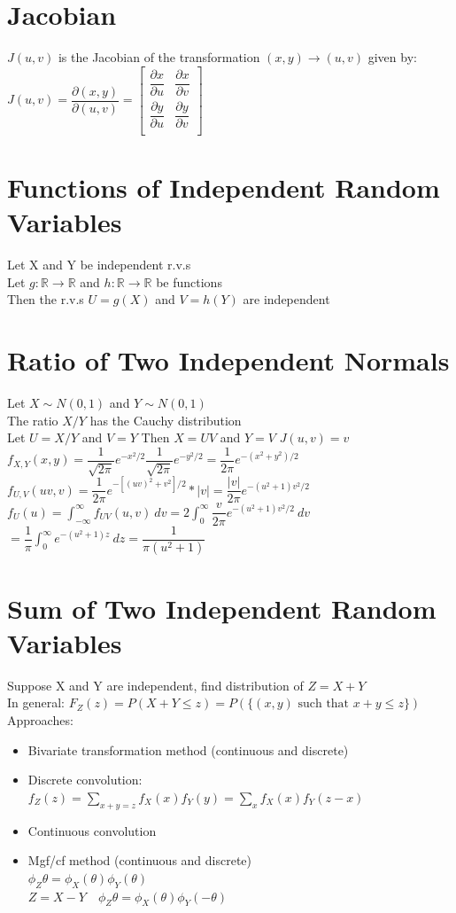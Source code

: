 \documentclass[openany]{book}
\begin{document}
\section{Jacobian}
$J(u,v)$ is the Jacobian of the transformation $(x,y)\to (u,v)$ given by:\medbreak
$J(u,v)=\dfrac{\partial(x,y)}{\partial(u,v)}=
\begin{bmatrix}
\dfrac{\partial x}{\partial u}& \dfrac{\partial x}{\partial v}\\
\dfrac{\partial y}{\partial u}& \dfrac{\partial y}{\partial v}\\
\end{bmatrix}$
\section{Functions of Independent Random Variables}
Let X and Y be independent r.v.s\\
Let $g:\mathbb{R}\to \mathbb{R}$ and $h:\mathbb{R}\to \mathbb{R}$ be functions\\
Then the r.v.s $U=g(X)$ and $V=h(Y)$ are independent
\section{Ratio of Two Independent Normals}
Let $X \sim N(0,1)$ and $Y\sim N(0,1)$\\
The ratio $X/Y$ has the Cauchy distribution\\
Let $U=X/Y$ and $V=Y$ \quad Then $X=UV$ and $Y=V$ \quad $J(u,v)=v$\\
$f_{X,Y}(x,y)=\dfrac{1}{\sqrt{2\pi}}e^{-x^2/2}\dfrac{1}{\sqrt{2\pi}}e^{-y^2/2}=\dfrac{1}{2\pi}e^{-(x^2+y^2)/2}$\\
$f_{U,V}(uv,v)=\dfrac{1}{2\pi}e^{-[(uv)^2+v^2]/2}*|v|=\dfrac{|v|}{2\pi}e^{-(u^2+1)v^2/2}$\\
$f_{U}(u)=\int_{-\infty}^{\infty}f_{UV}(u,v) \ dv=2\int_{0}^{\infty}\dfrac{v}{2\pi}e^{-(u^2+1)v^2/2} \ dv$\\
$=\dfrac{1}{\pi}\int_{0}^{\infty}e^{-(u^2+1)z} \ dz=\dfrac{1}{\pi(u^2+1)}$
\section{Sum of Two Independent Random Variables}
Suppose X and Y are independent, find distribution of $Z=X+Y$\\
In general: $F_Z(z)=P(X+Y\leq z)=P(\{(x,y) \text{ such that } x+y\leq z\})$\\
Approaches:
\begin{itemize}
\item Bivariate transformation method (continuous and discrete)\\
\item Discrete convolution:\\
$f_Z(z)=\sum_{x+y=z}f_X(x)f_Y(y)=\sum_{x}f_X(x)f_Y(z-x)$\\
\item Continuous convolution\\
\item Mgf/cf method (continuous and discrete)\\
$\phi_Z{\theta}=\phi_X(\theta)\phi_Y(\theta)$\\
$Z=X-Y \quad \phi_Z{\theta}=\phi_X(\theta)\phi_Y(-\theta)$
\end{itemize}
\end{document}
